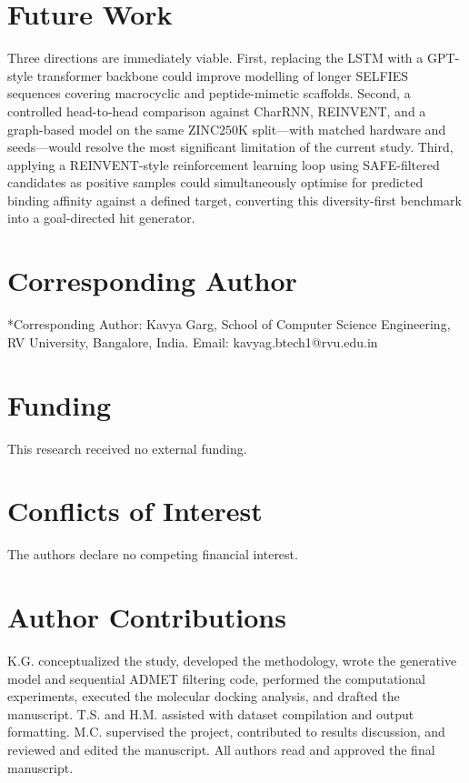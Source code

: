 \documentclass[conference]{IEEEtran}
\begin{document}
\section*{Future Work}

Three directions are immediately viable. First, replacing the LSTM with a GPT-style transformer backbone could improve modelling of longer SELFIES sequences covering macrocyclic and peptide-mimetic scaffolds. Second, a controlled head-to-head comparison against CharRNN, REINVENT, and a graph-based model on the same ZINC250K split---with matched hardware and seeds---would resolve the most significant limitation of the current study. Third, applying a REINVENT-style reinforcement learning loop using SAFE-filtered candidates as positive samples could simultaneously optimise for predicted binding affinity against a defined target, converting this diversity-first benchmark into a goal-directed hit generator.

\FloatBarrier

\section*{Corresponding Author}
*Corresponding Author: Kavya Garg, School of Computer Science Engineering, RV University, Bangalore, India. Email: kavyag.btech1@rvu.edu.in

\section*{Funding}
This research received no external funding.

\section*{Conflicts of Interest}
The authors declare no competing financial interest.

\section*{Author Contributions}

K.G. conceptualized the study, developed the methodology, wrote the generative model and sequential ADMET filtering code, performed the computational experiments, executed the molecular docking analysis, and drafted the manuscript. T.S. and H.M. assisted with dataset compilation and output formatting. M.C. supervised the project, contributed to results discussion, and reviewed and edited the manuscript. All authors read and approved the final manuscript.
\end{document}
